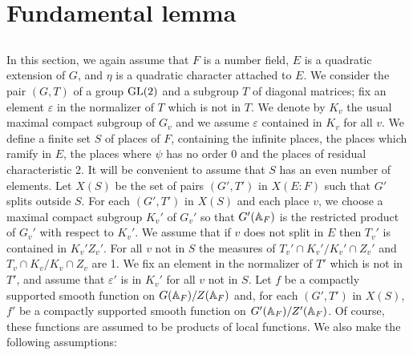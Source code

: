 \section{Fundamental lemma}


\subsection{}
In this section, we again assume that $F$ is a number field, $E$ is a quadratic extension of $G$,
and $\eta$ is a quadratic character attached to $E$.
We consider the pair $(G, T)$ of a group $\mathrm{GL}(2)$ and a subgroup $T$ of diagonal matrices;
fix an element $\varepsilon$ in the normalizer of $T$ which is not in $T$.
We denote by $K_v$ the usual maximal compact subgroup of $G_v$ and we assume $\varepsilon$ contained in $K_v$ for all $v$.
We define a finite set $S$ of places of $F$, containing the infinite places, the places which ramify in $E$, the places where $\psi$ has no order 0 and the places of residual characteristic 2.
It will be convenient to assume that $S$ has an even number of elements.
Let $X(S)$ be the set of pairs $(G', T')$ in $X(E:F)$ such that $G'$ splits outside $S$.
For each $(G', T')$ in $X(S)$ and each place $v$, we choose a maximal compact subgroup $K_v'$ of $G_v'$ so that $G'(\mathbb{A}_F)$ is the restricted product of $G_v'$ with respect to $K_v'$.
We assume that if $v$ does not split in $E$ then $T_v'$ is contained in $K_v' Z_v'$.
For all $v$ not in $S$ the measures of $T_v' \cap K_v' / K_v' \cap Z_v'$ and $T_v \cap K_v / K_v \cap Z_v$ are 1.
We fix an element in the normalizer of $T'$ which is not in $T'$, and assume that  $\varepsilon'$ is in $K_v'$ for all $v$ not in $S$.
Let $f$ be a compactly supported smooth function on $G(\mathbb{A}_F)/Z(\mathbb{A}_F)$ and, for each $(G', T')$ in $X(S)$, $f'$ be a compactly supported smooth function on $G'(\mathbb{A}_F) / Z'(\mathbb{A}_F)$.
Of course, these functions are assumed to be products of local functions.
We also make the following assumptions:
